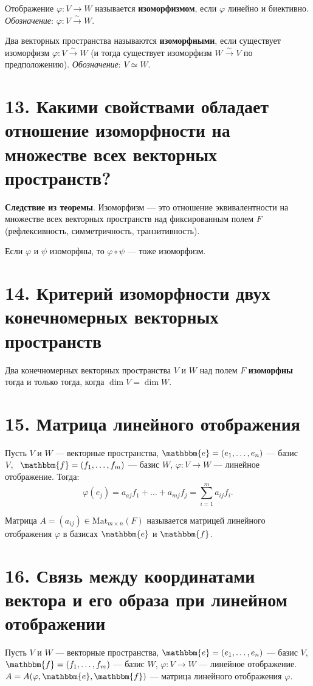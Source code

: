 \documentclass[a4paper, 12pt]{article}
\newcommand{\me}{\mathbbm{e}}
\newcommand{\mf}{\mathbbm{f}}
\begin{document}
Отображение $\varphi: V \rightarrow W$ называется \textbf{изоморфизмом}, если $\varphi$ линейно и биективно. \textit{Обозначение}: $\varphi: V \xrightarrow{\sim} W$.

Два векторных пространства называются \textbf{изоморфными}, если существует изоморфизм $\varphi: V \xrightarrow{\sim} W$ (и тогда существует изоморфизм $ W \xrightarrow{\sim} V$ по предположению). \textit{Обозначение}: $V \simeq W$.

\section*{13. Какими свойствами обладает отношение изоморфности на множестве всех векторных пространств?}
\textbf{Следствие из теоремы}. Изоморфизм --- это отношение эквивалентности на множестве всех векторных пространств над фиксированным полем $F$ (рефлексивность, симметричность, транзитивность).

Если $\varphi$ и $\psi$ изоморфны, то $\varphi \circ \psi$ --- тоже изоморфизм.

\section*{14. Критерий изоморфности двух конечномерных векторных пространств}
Два конечномерных векторных пространства $V$ и $W$ над полем $F$ \textbf{изоморфны} тогда и только тогда, когда $\dim V = \dim W$.

\section*{15. Матрица линейного отображения}
Пусть $V$ и $W$ --- векторные пространства, $\me = (e_1, \ldots, e_n)$ --- базис $V,\ \ \mf = (f_1, \ldots, f_m)$ --- базис $W$, $\varphi: V \rightarrow W$ --- линейное отображение. Тогда:
\vspace{-5mm}
\[
\varphi(e_j) = a_{aj}f_1 + \ldots + a_{mj}f_j = \sum_{i = 1}^{m} a_{ij}f_i.
\]

\vspace{-5mm}
Матрица $A = (a_{ij}) \in \text{Mat}_{m\times n}(F)$ называется матрицей линейного отображения $\varphi$ в базисах $\me$ и $\mf$.

\section*{16. Связь между координатами вектора и его образа при линейном отображении}
Пусть $V$ и $W$ --- векторные пространства, $\me = (e_1, \ldots, e_n)$ --- базис $V$, $\mf = (f_1, \ldots, f_m)$ --- базис $W$, $\varphi: V \rightarrow W$ --- линейное отображение. $A = A(\varphi, \me, \mf)$ --- матрица линейного отображения $\varphi$.
\end{document}
